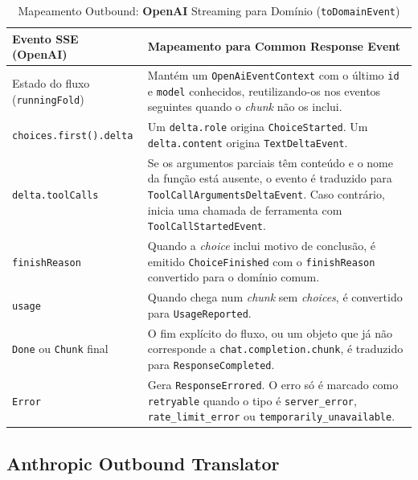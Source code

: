     \begin{table}[H]
        \centering
        \footnotesize
        \renewcommand{\arraystretch}{1.25}
        \begin{tabularx}{\textwidth}{|>{\raggedright\arraybackslash}p{4cm}|Y|}
            \hline
            \textbf{Evento SSE (OpenAI)} & \textbf{Mapeamento para Common Response Event} \\
            \hline
            Estado do fluxo (\texttt{runningFold}) & Mantém um \texttt{OpenAiEventContext} com o último \texttt{id} e \texttt{model} conhecidos, reutilizando-os nos eventos seguintes quando o \textit{chunk} não os inclui. \\
            \hline
            \texttt{choices.first().delta} & Um \texttt{delta.role} origina \texttt{ChoiceStarted}. Um \texttt{delta.content} origina \texttt{TextDeltaEvent}. \\
            \hline
            \texttt{delta.toolCalls} & Se os argumentos parciais têm conteúdo e o nome da função está ausente, o evento é traduzido para \texttt{ToolCallArgumentsDeltaEvent}. Caso contrário, inicia uma chamada de ferramenta com \texttt{ToolCallStartedEvent}. \\
            \hline
            \texttt{finishReason} & Quando a \textit{choice} inclui motivo de conclusão, é emitido \texttt{ChoiceFinished} com o \texttt{finishReason} convertido para o domínio comum. \\
            \hline
            \texttt{usage} & Quando chega num \textit{chunk} sem \textit{choices}, é convertido para \texttt{UsageReported}. \\
            \hline
            \texttt{Done} ou \texttt{Chunk} final & O fim explícito do fluxo, ou um objeto que já não corresponde a \texttt{chat.completion.chunk}, é traduzido para \texttt{ResponseCompleted}. \\
            \hline
            \texttt{Error} & Gera \texttt{ResponseErrored}. O erro só é marcado como \texttt{retryable} quando o tipo é \texttt{server\_error}, \texttt{rate\_limit\_error} ou \texttt{temporarily\_unavailable}. \\
            \hline
        \end{tabularx}
        \caption{Mapeamento Outbound: \textbf{OpenAI} Streaming para Domínio (\texttt{toDomainEvent})}
    \end{table}

    \subsection{\textbf{Anthropic} Outbound Translator}

